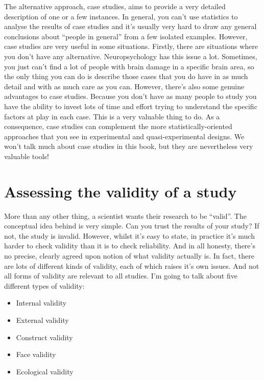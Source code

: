 The alternative approach, case studies, aims to provide a very detailed description of one or a few instances. In general, you can't use statistics to analyse the results of case studies and it's usually very hard to draw any general conclusions about ``people in general'' from a few isolated examples. However, case studies are very useful in some situations. Firstly, there are situations where you don't have any alternative. Neuropsychology has this issue a lot. Sometimes, you just can't find a lot of people with brain damage in a specific brain area, so the only thing you can do is describe those cases that you do have in as much detail and with as much care as you can. However, there's also some genuine advantages to case studies. Because you don't have as many people to study you have the ability to invest lots of time and effort trying to understand the specific factors at play in each case. This is a very valuable thing to do. As a consequence, case studies can complement the more statistically-oriented approaches that you see in experimental and quasi-experimental designs. We won't talk much about case studies in this book, but they are nevertheless very valuable tools!


\section{Assessing the validity of a study~\label{sec:validity}}

More than any other thing, a scientist wants their research to be ``valid''. The conceptual idea behind  is very simple. Can you trust the results of your study? If not, the study is invalid. However, whilst it's easy to state, in practice it's much harder to check validity than it is to check reliability. And in all honesty, there's no precise, clearly agreed upon notion of what validity actually is. In fact, there are lots of different kinds of validity, each of which raises it's own issues. And not all forms of validity are relevant to all studies. I'm going to talk about five different types of validity:

\begin{itemize} \itemsep -2pt
\item Internal validity
\item External validity
\item Construct validity
\item Face validity
\item Ecological validity
\end{itemize}

